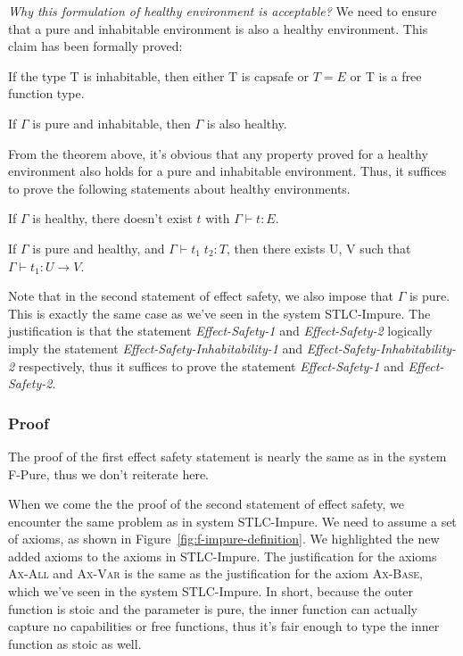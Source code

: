\emph{Why this formulation of healthy environment is acceptable?} We
need to ensure that a pure and inhabitable environment is also a
healthy environment. This claim has been formally proved:

\begin{lemma}
  If the type T is inhabitable, then either T is capsafe or $T = E$ or
  T is a free function type.
\end{lemma}

\begin{theorem}
  If $\Gamma$ is pure and inhabitable, then $\Gamma$ is also healthy.
\end{theorem}

From the theorem above, it's obvious that any property proved for a
healthy environment also holds for a pure and inhabitable
environment. Thus, it suffices to prove the following statements about
healthy environments.

\begin{definition}
  If $\Gamma$ is healthy, there doesn't exist $t$ with
  $\Gamma \vdash t : E$.
\end{definition}

\begin{definition}
  If $\Gamma$ is pure and healthy, and $\Gamma \vdash t_1 \; t_2 : T$,
  then there exists U, V such that $\Gamma \vdash t_1 : U \to V$.
\end{definition}

Note that in the second statement of effect safety, we also impose
that $\Gamma$ is pure. This is exactly the same case as we've seen in
the system STLC-Impure. The justification is that the statement
\emph{Effect-Safety-1} and \emph{Effect-Safety-2} logically imply the
statement \emph{Effect-Safety-Inhabitability-1} and
\emph{Effect-Safety-Inhabitability-2} respectively, thus it suffices
to prove the statement \emph{Effect-Safety-1} and
\emph{Effect-Safety-2}.

\subsubsection{Proof}

The proof of the first effect safety statement is nearly the same as
in the system F-Pure, thus we don't reiterate here.

When we come the the proof of the second statement of effect safety,
we encounter the same problem as in system STLC-Impure. We need to
assume a set of axioms, as shown in
Figure~\ref{fig:f-impure-definition}. We highlighted the new added
axioms to the axioms in STLC-Impure. The justification for the axioms
\textsc{Ax-All} and \textsc{Ax-Var} is the same as the justification
for the axiom \textsc{Ax-Base}, which we've seen in the system
STLC-Impure. In short, because the outer function is stoic and the
parameter is pure, the inner function can actually capture no
capabilities or free functions, thus it's fair enough to type the
inner function as stoic as well.

